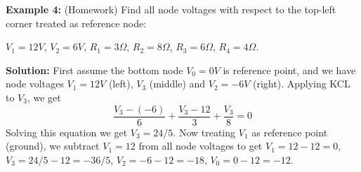 \usepackage{html}



  {\bf Example 4:} (Homework) Find all node voltages with respect to the top-left
  corner treated as reference node:


  $V_1=12 V$, $V_2=6 V$, $R_1=3 \Omega$, $R_2=8 \Omega$, $R_3=6 \Omega$, $R_4=4\Omega$.

  {\bf Solution:} First assume the bottom node $V_0=0V$ is reference point, and we
  have node voltages $V_1=12V$ (left), $V_3$ (middle) and $V_2=-6V$ (right). Applying
  KCL to $V_3$, we get
  \[ 
  \frac{V_3-(-6)}{6}+\frac{V_3-12}{3}+\frac{V_3}{8}=0 
  \]
  Solving this equation we get $V_3=24/5$. Now treating $V_1$ as reference point
  (ground), we subtract $V_1=12$ from all node voltages to get $V_1=12-12=0$, 
  $V_3=24/5-12=-36/5$, $V_2=-6-12=-18$, $V_0=0-12=-12$.




